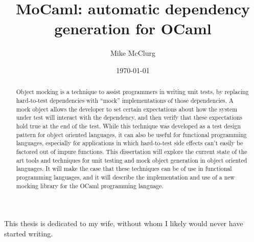 \documentclass[dissertation]{softeng}
\title{MoCaml: automatic dependency generation for OCaml}
\author{Mike McClurg}
\date{\today}
\begin{document}
\maketitle

\begin{abstract}

  Object mocking is a technique to assist programmers in writing unit
  tests, by replacing hard-to-test dependencies with ``mock''
  implementations of those dependencies. A mock object allows the
  developer to set certain expectations about how the system under
  test will interact with the dependency, and then verify that these
  expectations hold true at the end of the test. While this technique
  was developed as a test design pattern for object oriented
  languages, it can also be useful for functional programming
  languages, especially for applications in which hard-to-test side
  effects can't easily be factored out of impure functions. This
  dissertation will explore the current state of the art tools and
  techniques for unit testing and mock object generation in object
  oriented languages. It will make the case that these techniques can
  be of use in functional programming languages, and it will describe
  the implementation and use of a new mocking library for the OCaml
  programming language.


\end{abstract}

\newpage

\begin{centering}

  This thesis is dedicated to my wife, without whom I likely would
  never have started writing.

\end{centering}

\newpage

\tableofcontents

\newpage

\listoffigures








\end{document}

